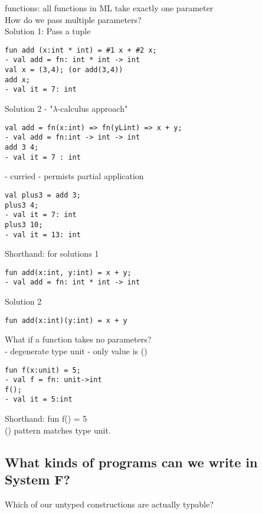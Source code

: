 \documentclass[11pt]{article}
\begin{document}
functions: all functions in ML take exactly one parameter \\

How do we pass multiple parameters? \\

Solution 1: Pass a tuple
\begin{verbatim}
fun add (x:int * int) = #1 x + #2 x;
- val add = fn: int * int -> int
val x = (3,4); (or add(3,4))
add x;
- val it = 7: int
\end{verbatim}

Solution 2 - "$\lambda$-calculus approach" 
\begin{verbatim}
val add = fn(x:int) => fn(yLint) => x + y;
- val add = fn:int -> int -> int
add 3 4;
- val it = 7 : int
\end{verbatim}

- curried - permists partial application
\begin{verbatim}
val plus3 = add 3;
plus3 4;
- val it = 7: int
plus3 10;
- val it = 13: int
\end{verbatim}

Shorthand: for solutions 1
\begin{verbatim}
fun add(x:int, y:int) = x + y;
- val add = fn: int * int -> int
\end{verbatim}

Solution 2
\begin{verbatim}
fun add(x:int)(y:int) = x + y
\end{verbatim}

What if a function takes no parameters?  \\

- degenerate type unit - only value is ()

\begin{verbatim}
fun f(x:unit) = 5;
- val f = fn: unit->int
f();
- val it = 5:int
\end{verbatim}

Shorthand: fun f() = 5 \\

() pattern matches type unit. \\

\subsection{What kinds of programs can we write in System F?}

Which of our untyped constructions are actually typable? \\
\end{document}
